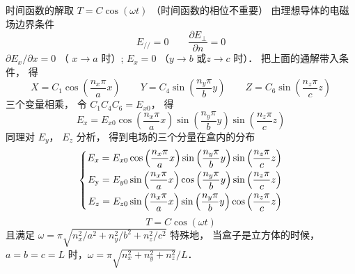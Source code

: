 时间函数的解取 $T = C\cos \left( {\omega t} \right)$ （时间函数的相位不重要）
由理想导体的电磁场边界条件%
\begin{equation}
{E_{//}} = 0
\qquad
 \frac{{\partial {E_ \bot }}}{{\partial n}} = 0
\end{equation}  
 ${{\partial {E_x}}}/{{\partial x}} = 0$ （ $x \to a$ 时）;  ${E_x} = 0$ （$y \to b$ 或$z \to c$ 时）． 把上面的通解带入条件， 得
\begin{equation}
X = {C_1}\cos \left( {\frac{{{n_x}\pi }}{a}x} \right)
\qquad
Y = {C_4}\sin \left( {\frac{{{n_y}\pi }}{b}y} \right)
\qquad
Z = {C_6}\sin \left( {\frac{{{n_z}\pi }}{c}z} \right)
\end{equation}  
三个变量相乘， 令 ${C_1}{C_4}{C_6} = {E_{x0}}$，  得
\begin{equation}
{E_x} = {E_{x0}}\cos \left( {\frac{{{n_x}\pi }}{a}x} \right)\sin \left( {\frac{{{n_y}\pi }}{b}y} \right)\sin \left( {\frac{{{n_z}\pi }}{c}z} \right)
\end{equation} 
同理对 ${E_y}$，  ${E_z}$ 分析， 得到电场的三个分量在盒内的分布
\begin{equation}
\left\{ \begin{aligned}
{E_x} = {E_{x0}}\cos \left( {\frac{{{n_x}\pi }}{a}x} \right)\sin \left( {\frac{{{n_y}\pi }}{b}y} \right)\sin \left( {\frac{{{n_z}\pi }}{c}z} \right)\\
{E_{\rm{y}}} = {E_{y0}}\sin \left( {\frac{{{n_x}\pi }}{a}x} \right)\cos \left( {\frac{{{n_y}\pi }}{b}y} \right)\sin \left( {\frac{{{n_z}\pi }}{c}z} \right)\\
{E_z} = {E_{z0}}\sin \left( {\frac{{{n_x}\pi }}{a}x} \right)\sin \left( {\frac{{{n_y}\pi }}{b}y} \right)\cos \left( {\frac{{{n_z}\pi }}{c}z} \right)
\end{aligned} \right.
\end{equation} 
\begin{equation}
T = C\cos \left( {\omega t} \right)
\end{equation}
且满足 $\omega  = \pi \sqrt {{{n_x^2}/}{{{a^2}}} + {{n_y^2}}/{{{b^2}}} + {{n_z^2}}/{{{c^2}}}} $
特殊地， 当盒子是立方体的时候， $a = b = c = L$ 时，$\omega  = {\pi }\sqrt {n_x^2 + n_y^2 + n_z^2}/L $．   




